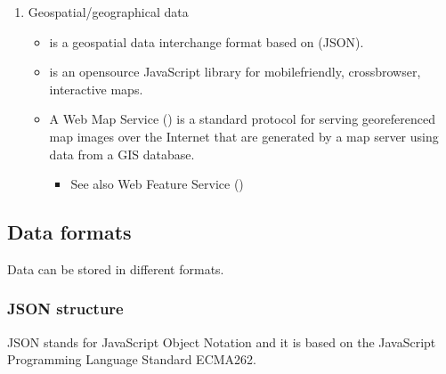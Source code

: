 \documentclass[a4paper,12pt,english]{sphinxhowto}
\begin{document}
\begin{enumerate}
\item {} 
Geospatial/geographical data
\begin{itemize}
\item {} 
 is a geospatial data interchange format based on  (JSON).

\item {} 
 is an open\sphinxhyphen{}source JavaScript library for mobile\sphinxhyphen{}friendly, cross\sphinxhyphen{}browser, interactive maps.

\item {} 
A Web Map Service () is a standard protocol for serving georeferenced map images over the Internet that are generated by a map server using data from a GIS database.
\begin{itemize}
\item {} 
See also Web Feature Service ()

\end{itemize}

\end{itemize}

\end{enumerate}


\ignorespaces 

\subsection{Data formats}
\label{\detokenize{DDHH:data-formats}}\label{\detokenize{DDHH:index-0}}
Data can be stored in different formats.



\subsubsection{JSON structure}
\label{\detokenize{DDHH:json-structure}}\label{\detokenize{DDHH:json-str}}
JSON stands for JavaScript Object Notation and it is based on the JavaScript Programming Language Standard ECMA\sphinxhyphen{}262.
\end{document}
